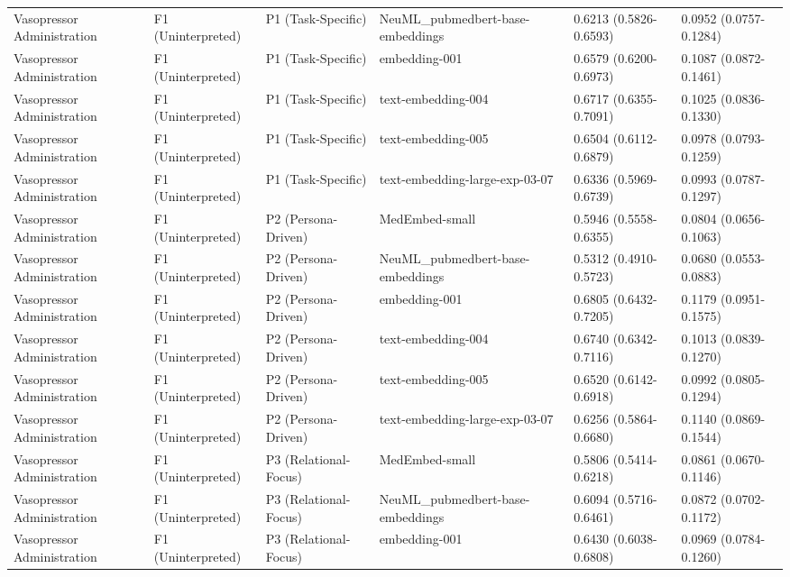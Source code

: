 \documentclass[border=0pt]{standalone}
\begin{document}
\begin{adjustbox}{width=\textwidth}
\begin{tabular}{llllll}
Vasopressor Administration & F1 (Uninterpreted) & P1 (Task-Specific) & NeuML\_pubmedbert-base-embeddings & 0.6213 (0.5826-0.6593) & 0.0952 (0.0757-0.1284) \\
Vasopressor Administration & F1 (Uninterpreted) & P1 (Task-Specific) & embedding-001 & 0.6579 (0.6200-0.6973) & 0.1087 (0.0872-0.1461) \\
Vasopressor Administration & F1 (Uninterpreted) & P1 (Task-Specific) & text-embedding-004 & 0.6717 (0.6355-0.7091) & 0.1025 (0.0836-0.1330) \\
Vasopressor Administration & F1 (Uninterpreted) & P1 (Task-Specific) & text-embedding-005 & 0.6504 (0.6112-0.6879) & 0.0978 (0.0793-0.1259) \\
Vasopressor Administration & F1 (Uninterpreted) & P1 (Task-Specific) & text-embedding-large-exp-03-07 & 0.6336 (0.5969-0.6739) & 0.0993 (0.0787-0.1297) \\
Vasopressor Administration & F1 (Uninterpreted) & P2 (Persona-Driven) & MedEmbed-small & 0.5946 (0.5558-0.6355) & 0.0804 (0.0656-0.1063) \\
Vasopressor Administration & F1 (Uninterpreted) & P2 (Persona-Driven) & NeuML\_pubmedbert-base-embeddings & 0.5312 (0.4910-0.5723) & 0.0680 (0.0553-0.0883) \\
Vasopressor Administration & F1 (Uninterpreted) & P2 (Persona-Driven) & embedding-001 & 0.6805 (0.6432-0.7205) & 0.1179 (0.0951-0.1575) \\
Vasopressor Administration & F1 (Uninterpreted) & P2 (Persona-Driven) & text-embedding-004 & 0.6740 (0.6342-0.7116) & 0.1013 (0.0839-0.1270) \\
Vasopressor Administration & F1 (Uninterpreted) & P2 (Persona-Driven) & text-embedding-005 & 0.6520 (0.6142-0.6918) & 0.0992 (0.0805-0.1294) \\
Vasopressor Administration & F1 (Uninterpreted) & P2 (Persona-Driven) & text-embedding-large-exp-03-07 & 0.6256 (0.5864-0.6680) & 0.1140 (0.0869-0.1544) \\
Vasopressor Administration & F1 (Uninterpreted) & P3 (Relational-Focus) & MedEmbed-small & 0.5806 (0.5414-0.6218) & 0.0861 (0.0670-0.1146) \\
Vasopressor Administration & F1 (Uninterpreted) & P3 (Relational-Focus) & NeuML\_pubmedbert-base-embeddings & 0.6094 (0.5716-0.6461) & 0.0872 (0.0702-0.1172) \\
Vasopressor Administration & F1 (Uninterpreted) & P3 (Relational-Focus) & embedding-001 & 0.6430 (0.6038-0.6808) & 0.0969 (0.0784-0.1260) \\

\end{tabular}
\end{adjustbox}
\end{document}
